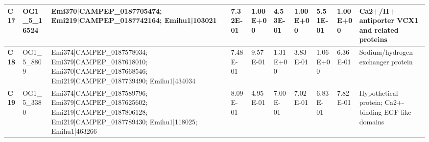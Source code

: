 \begin{landscape}
\begin{center}
\begin{footnotesize}
\begin{longtable}{|p{0.5cm}|p{1.5cm}|p{4cm}|l|l|l|l|l|l|l|}
\textbf{C17} & OG1\_5\_16524 & Emi370|CAMPEP\_0187705474; Emi219|CAMPEP\_0187742164; Emihu1|103021                                                                                                                                                                                                                                                                                                                                                                                                                                                                                                                                                                      & 7.32E-01  & 1.00E+00 & 4.53E-01  & 1.00E+00 & 5.51E-01  & 1.00E+00 & Ca2+/H+ antiporter VCX1 and related proteins                                 \\ \hline
\textbf{C18} & OG1\_5\_8809  & Emi374|CAMPEP\_0187578034; Emi379|CAMPEP\_0187618010; Emi370|CAMPEP\_0187668546; Emi219|CAMPEP\_0187739490; Emihu1|434034                                                                                                                                                                                                                                                                                                                                                                                                                                                                                                                & 7.48E-01  & 9.57E-01 & 1.31E+00  & 3.83E-01 & 1.06E+00  & 6.36E-01 & Sodium/hydrogen exchanger protein                                            \\ \hline
\textbf{C19} & OG1\_5\_3380  & Emi374|CAMPEP\_0187589796; Emi379|CAMPEP\_0187625602; Emi219|CAMPEP\_0187806128; Emi219|CAMPEP\_0187789430; Emihu1|118025; Emihu1|463266                                                                                                                                                                                                                                                                                                                                                                                                                                                                                                 & 8.09E-01  & 4.95E-01 & 7.00E-01  & 7.02E-01 & 6.83E-01  & 7.82E-01 & Hypothetical protein; Ca2+-binding EGF-like domains                          \\ \hline

\end{longtable}
\end{footnotesize}
\end{center}
\end{landscape}
